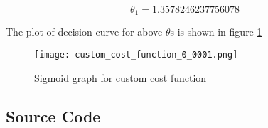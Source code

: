 \begin{equation}
\theta_1 = 1.3578246237756078
\end{equation}

The plot of decision curve for above $\theta$s is shown in figure \ref{fig:custom_cost_function}

\begin{figure}[!ht]
  \texttt{[image: custom\_cost\_function\_0\_0001.png]}
  \caption{Sigmoid graph for custom cost function}
  \label{fig:custom_cost_function}
\end{figure}

\subsection{Source Code}

